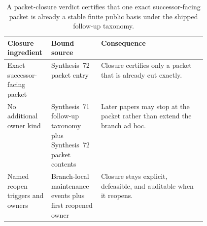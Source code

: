 \documentclass[11pt]{article}
\begin{document}
\begin{table}[t]
\centering
\footnotesize
\begin{tabularx}{\linewidth}{@{}p{0.22\linewidth}p{0.25\linewidth}X@{}}
\toprule
Closure ingredient & Bound source & Consequence \\
\midrule
Exact successor-facing packet & Synthesis~72 packet entry & Closure certifies only a packet that is already cut exactly. \\
No additional owner kind & Synthesis~71 follow-up taxonomy plus Synthesis~72 packet contents & Later papers may stop at the packet rather than extend the branch ad hoc. \\
Named reopen triggers and owners & Branch-local maintenance events plus first reopened owner & Closure stays explicit, defeasible, and auditable when it reopens. \\
\bottomrule
\end{tabularx}
\caption{A packet-closure verdict certifies that one exact successor-facing packet is already a stable finite public basis under the shipped follow-up taxonomy.}
\label{tab:publicrequestresponsepacketrefreshresponsepacketclosure}
\end{table}
\end{document}
